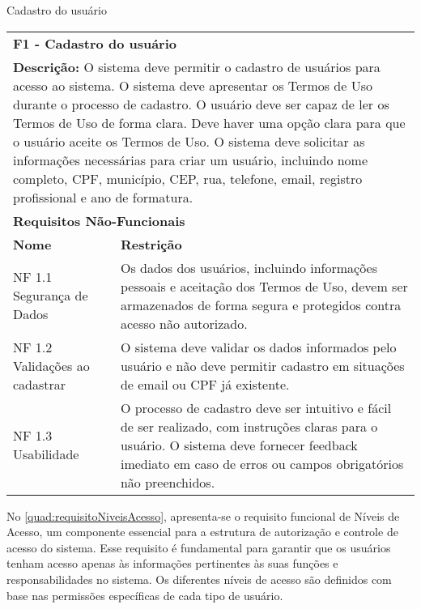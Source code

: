 \begin{tabframed}[htb]
  \caption{Cadastro do usuário}
  \label{quad:requisitoCadastroUsuario}
  \renewcommand{\arraystretch}{1.5}
  \begin{tabular}{|l|l|}
    \cline{1-2}
    \multicolumn{2}{|l|}{\textbf{F1 - Cadastro do usuário} }
    \\ \cline{1-2}

    \multicolumn{2}{|p{15cm}|}{
    \raggedright \textbf{Descrição:} O sistema deve permitir o cadastro de usuários para acesso ao sistema. O sistema deve apresentar os Termos de Uso durante o processo de cadastro. O usuário deve ser capaz de ler os Termos de Uso de forma clara. Deve haver uma opção clara para que o usuário aceite os Termos de Uso. O sistema deve solicitar as informações necessárias para criar um usuário, incluindo nome completo, CPF, município, CEP, rua, telefone, email, registro profissional e ano de formatura.
    }
    \\ \cline{1-2}

    \multicolumn{2}{|l|}{\textbf{Requisitos Não-Funcionais}}
    \\ \cline{1-2}

    \textbf{Nome}                  &
    \textbf{Restrição}
    \\ \cline{1-2}

    NF 1.1 Segurança de Dados      &
    \multicolumn{1}{|p{8cm}|}{\raggedright Os dados dos usuários, incluindo informações pessoais e aceitação dos Termos de Uso, devem ser armazenados de forma segura e protegidos contra acesso não autorizado.}
    \\ \cline{1-2}

    NF 1.2 Validações ao cadastrar &
    \multicolumn{1}{|p{8cm}|}{\raggedright O sistema deve validar os dados informados pelo usuário e não deve permitir cadastro em situações de email ou CPF já existente.}
    \\ \cline{1-2}

    NF 1.3 Usabilidade             &
    \multicolumn{1}{|p{8cm}|}{\raggedright O processo de cadastro deve ser intuitivo e fácil de ser realizado, com instruções claras para o usuário. O sistema deve fornecer feedback imediato em caso de erros ou campos obrigatórios não preenchidos.}
    \\ \cline{1-2}
  \end{tabular}
  \fonte{} %
\end{tabframed}

No \autoref{quad:requisitoNiveisAcesso}, apresenta-se o requisito funcional de Níveis de Acesso, um componente essencial para a estrutura de autorização e controle de acesso do sistema. Esse requisito é fundamental para garantir que os usuários tenham acesso apenas às informações pertinentes às suas funções e responsabilidades no sistema. Os diferentes níveis de acesso são definidos com base nas permissões específicas de cada tipo de usuário.


